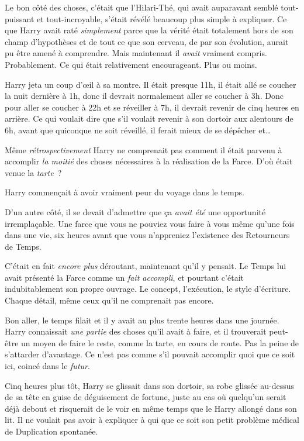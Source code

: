 Le bon côté des choses, c'était que l'Hilari-Thé, qui avait auparavant semblé tout-puissant et tout-incroyable, s'était révélé beaucoup plus simple à expliquer. Ce que Harry avait raté \emph{simplement} parce que la vérité était totalement hors de son champ d'hypothèses et de tout ce que son cerveau, de par son évolution, aurait pu être amené à comprendre. Mais maintenant il \emph{avait} vraiment compris. Probablement. Ce qui était relativement encourageant. Plus ou moins.

Harry jeta un coup d'œil à sa montre. Il était presque 11h, il était allé se coucher la nuit dernière à 1h, donc il devrait normalement aller se coucher à 3h. Donc pour aller se coucher à 22h et se réveiller à 7h, il devrait revenir de cinq heures en arrière. Ce qui voulait dire que s'il voulait revenir à son dortoir aux alentours de 6h, avant que quiconque ne soit réveillé, il ferait mieux de se dépêcher et…

Même \emph{rétrospectivement} Harry ne comprenait pas comment il était parvenu à accomplir \emph{la moitié} des choses nécessaires à la réalisation de la Farce. D'où était venue la \emph{tarte}~?

Harry commençait à avoir vraiment peur du voyage dans le temps.

D'un autre côté, il se devait d'admettre que ça \emph{avait été} une opportunité irremplaçable. Une farce que vous ne pouviez vous faire à vous même qu'une fois dans une vie, six heures avant que vous n'appreniez l'existence des Retourneurs de Temps.

C'était en fait \emph{encore plus} déroutant, maintenant qu'il y pensait. Le Temps lui avait présenté la Farce comme un \emph{fait accompli}, et pourtant c'était indubitablement son propre ouvrage. Le concept, l'exécution, le style d'écriture. Chaque détail, même ceux qu'il ne comprenait pas encore.

Bon aller, le temps filait et il y avait au plus trente heures dans une journée. Harry connaissait \emph{une partie} des choses qu'il avait à faire, et il trouverait peut-être un moyen de faire le reste, comme la tarte, en cours de route. Pas la peine de s'attarder d'avantage. Ce n'est pas comme s'il pouvait accomplir quoi que ce soit ici, coincé dans le \emph{futur}.

\later


Cinq heures plus tôt, Harry se glissait dans son dortoir, sa robe glissée au-dessus de sa tête en guise de déguisement de fortune, juste au cas où quelqu'un serait déjà debout et risquerait de le voir en même temps que le Harry allongé dans son lit. Il ne voulait pas avoir à expliquer à qui que ce soit son petit problème médical de Duplication spontanée.

